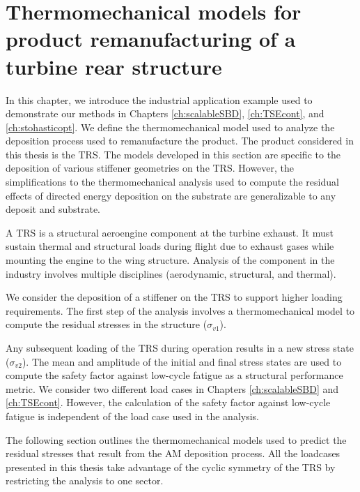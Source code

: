 \chapter{Thermomechanical models for product remanufacturing of a turbine rear structure}
\label{ch:thermomechanical}

In this chapter, we introduce the industrial application example used to demonstrate our methods in Chapters \ref{ch:scalableSBD}, \ref{ch:TSEcont}, and \ref{ch:stohasticopt}. We define the thermomechanical model used to analyze the deposition process used to remanufacture the product. The product considered in this thesis is the \ac{TRS}. The models developed in this section are specific to the deposition of various stiffener geometries on the \acf{TRS}. However, the simplifications to the thermomechanical analysis used to compute the residual effects of directed energy deposition on the substrate are generalizable to any deposit and substrate.

A \ac{TRS} is a structural aeroengine component at the turbine exhaust. It must sustain thermal and structural loads during flight due to exhaust gases while mounting the engine to the wing structure. Analysis of the component in the industry involves multiple disciplines (aerodynamic, structural, and thermal). 

We consider the deposition of a stiffener on the \ac{TRS} to support higher loading requirements. The first step of the analysis involves a thermomechanical model to compute the residual stresses in the structure ($\sigma_{v1}$). 

Any subsequent loading of the \ac{TRS} during operation results in a new stress state ($\sigma_{v2}$). The mean and amplitude of the initial and final stress states are used to compute the safety factor against low-cycle fatigue as a structural performance metric. We consider two different load cases in Chapters \ref{ch:scalableSBD} and \ref{ch:TSEcont}. However, the calculation of the safety factor against low-cycle fatigue is independent of the load case used in the analysis.

The following section outlines the thermomechanical models used to predict the residual stresses that result from the \ac{AM} deposition process. All the loadcases presented in this thesis take advantage of the cyclic symmetry of the \ac{TRS} by restricting the analysis to one sector.

